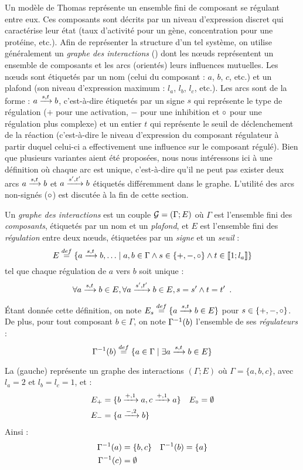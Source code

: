 Un modèle de Thomas représente un ensemble fini de composant se régulant entre eux.
Ces composants sont décrits par un niveau d'expression discret qui
caractérise leur état (taux d'activité pour un gène, concentration pour une protéine, etc.).
Afin de représenter la structure d'un tel système,
on utilise généralement un \emph{graphe des interactions} ()
dont les nœuds représentent un ensemble de composants
et les arcs (orientés) leurs influences mutuelles.
Les nœuds sont étiquetés par un nom (celui du composant : $a$, $b$, $c$, etc.)
et un plafond (son niveau d'expression maximum : $l_a$, $l_b$, $l_c$, etc.).
Les arcs sont de la forme : $a \xrightarrow{s, t} b$,
c'est-à-dire étiquetés par un signe $s$ qui représente le type de régulation
($+$ pour une activation, $-$ pour une inhibition
et $\circ$ pour une régulation plus complexe)
et un entier $t$ qui représente le seuil de déclenchement de la réaction
(c'est-à-dire le niveau d'expression du composant régulateur à partir duquel celui-ci
a effectivement une influence sur le composant régulé).
Bien que plusieurs variantes aient été proposées,
nous nous intéressons ici à une définition où
chaque arc est unique, c'est-à-dire qu'il ne peut pas exister deux arcs
$a \xrightarrow{s, t} b$ et $a \xrightarrow{s', t'} b$ étiquetés différemment dans le graphe.
L'utilité des arcs non-signés ($\circ$) est discutée à la fin de cette section.

\begin{definition}
  Un \emph{graphe des interactions} est un couple $\mathcal{G} = (\Gamma; E)$ où
  $\Gamma$ est l'ensemble fini des \emph{composants},
  étiquetés par un nom et un \emph{plafond},
  et $E$ est l'ensemble fini des \emph{régulation} entre deux nœuds,
  étiquetées par un \emph{signe} et un \emph{seuil} :
    \[E \stackrel{def}= \{ a \xrightarrow{s, t} b, \ldots \mid
      a, b \in \Gamma \wedge s \in \{ +, -, \circ \} \wedge t \in \mathopen{\llbracket}1\mathclose{};l_a\mathclose{\rrbracket}\}\]
  tel que chaque régulation de $a$ vers $b$ soit unique :
    \[\forall a \xrightarrow{s, t} b \in E,
      \forall a \xrightarrow{s', t'} b \in E, s = s' \wedge t = t' \enspace.\]
\end{definition}
%
Étant donnée cette définition, on note
$E_s \stackrel{def}= \{ a \xrightarrow{s, t} b \in E \}$ pour $s \in \{ +, -, \circ \}$.
De plus, pour tout composant $b \in \Gamma$, on note $\Gamma^{-1}(b)$ l'ensemble de ses
\emph{régulateurs} :
    \[\Gamma^{-1}(b) \stackrel{def}= \{ a \in \Gamma \mid \exists a \xrightarrow{s, t} b \in E \}\]

\begin{example}
  La (gauche) représente un graphe des interactions $(\Gamma; E)$ où
  $\Gamma = \{a, b, c\}$, avec $l_a = 2$ et $l_b = l_c = 1$, et :
  \begin{align*}
    E_+ &= \{b \xrightarrow{+, 1} a, c \xrightarrow{+, 1} a\} &
    E_\circ &= \emptyset \\
    E_- &= \{a \xrightarrow{-, 2} b\}
  \end{align*}
  Ainsi :
  \begin{align*}
    \Gamma^{-1}(a) &= \{ b, c \} &
    \Gamma^{-1}(b) &= \{ a \} \\
    \Gamma^{-1}(c) &= \emptyset
  \end{align*}
\end{example}

